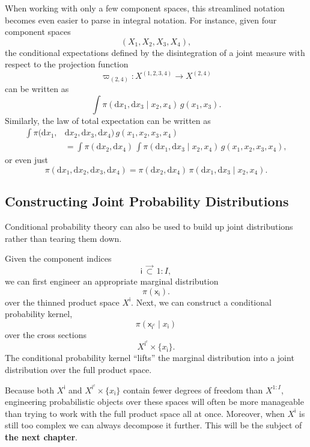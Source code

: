 \documentclass[
  letterpaper,
  DIV=11,
  numbers=noendperiod]{scrartcl}
\begin{document}
When working with only a few component spaces, this streamlined notation
becomes even easier to parse in integral notation. For instance, given
four component spaces \[
( X_{1}, X_{2}, X_{3}, X_{4} ),
\] the conditional expectations defined by the disintegration of a joint
measure with respect to the projection function \[
\varpi_{(2, 4)} : X^{(1, 2, 3, 4)} \rightarrow X^{(2, 4)}
\] can be written as \[
\int
\pi( \mathrm{d} x_{1}, \mathrm{d} x_{3} \mid x_{2}, x_{4} ) \,
g( x_{1}, x_{3} ).
\] Similarly, the law of total expectation can be written as
\begin{align*}
\int
\pi(
  \mathrm{d} x_{1}, &\mathrm{d} x_{2},
  \mathrm{d} x_{3}, \mathrm{d} x_{4}
) \,
g( x_{1}, x_{2}, x_{3}, x_{4} )
\\
&=
\int
\pi( \mathrm{d} x_{2}, \mathrm{d} x_{4} ) \,
\int
\pi( \mathrm{d} x_{1}, \mathrm{d} x_{3} \mid x_{2}, x_{4} ) \,
g( x_{1}, x_{2}, x_{3}, x_{4} ),
\end{align*} or even just \[
\pi(
  \mathrm{d} x_{1}, \mathrm{d} x_{2},
  \mathrm{d} x_{3}, \mathrm{d} x_{4}
)
=
\pi( \mathrm{d} x_{2}, \mathrm{d} x_{4} ) \,
\pi( \mathrm{d} x_{1}, \mathrm{d} x_{3} \mid x_{2}, x_{4} ).
\]

\subsection{Constructing Joint Probability
Distributions}\label{constructing-joint-probability-distributions}

Conditional probability theory can also be used to build up joint
distributions rather than tearing them down.

Given the component indices \[
\mathsf{i} \, \vec{\subset} \, 1:I,
\] we can first engineer an appropriate marginal distribution \[
\pi( \mathsf{x}_{ \mathsf{i} } ).
\] over the thinned product space \(X^{ \mathsf{i} }\). Next, we can
construct a conditional probability kernel, \[
\pi(
  \mathsf{x}_{ \mathsf{i}^{c} } \mid
  x_{ \mathsf{i} }
)
\] over the cross sections \[
X^{ \mathsf{i}^{c} } \times \{ x_{ \mathsf{i} } \}.
\] The conditional probability kernel ``lifts'' the marginal
distribution into a joint distribution over the full product space.

Because both \(X^{ \mathsf{i} }\) and
\(X^{ \mathsf{i}^{c} } \times \{ x_{ \mathsf{i} } \}\) contain fewer
degrees of freedom than \(X^{1:I}\), engineering probabilistic objects
over these spaces will often be more manageable than trying to work with
the full product space all at once. Moreover, when \(X^{ \mathsf{i} }\)
is still too complex we can always decompose it further. This will be
the subject of \textbf{the next chapter}.
\end{document}
